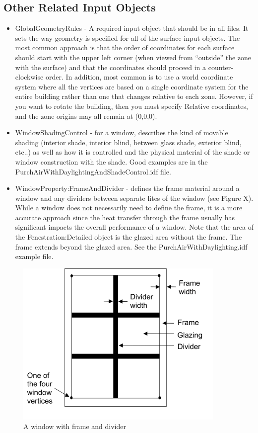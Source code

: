 \subsection*{Other Related Input Objects}
\begin{itemize}
\item GlobalGeometryRules - A required input object that should be in all
files. It sets the way geometry is specified for all of the surface
input objects. The most common approach is that the order of coordinates
for each surface should start with the upper left corner (when viewed
from ``outside'' the zone with the surface) and that the coordinates
should proceed in a counter-clockwise order. In addition, most common
is to use a world coordinate system where all the vertices are based
on a single coordinate system for the entire building rather than
one that changes relative to each zone. However, if you want to rotate
the building, then you must specify Relative coordinates, and the
zone origins may all remain at (0,0,0).
\item WindowShadingControl - for a window, describes the kind of movable
shading (interior shade, interior blind, between glass shade, exterior
blind, etc..) as well as how it is controlled and the physical material
of the shade or window construction with the shade. Good examples
are in the PurchAirWithDaylightingAndShadeControl.idf file.
\item WindowProperty:FrameAndDivider - defines the frame material around
a window and any dividers between separate lites of the window (see
Figure X). While a window does not necessarily need to define the
frame, it is a more accurate approach since the heat transfer through
the frame usually has significant impacts the overall performance
of a window. Note that the area of the Fenestration:Detailed object
is the glazed area without the frame. The frame extends beyond the
glazed area. See the PurchAirWithDaylighting.idf example file.
\end{itemize}

\begin{figure}[hbtp] 
\centering
\includegraphics[width=0.9\textwidth, height=0.9\textheight, keepaspectratio=true]{media/window_frame_and_divider.png}
\caption{A window with frame and divider}
\end{figure}

